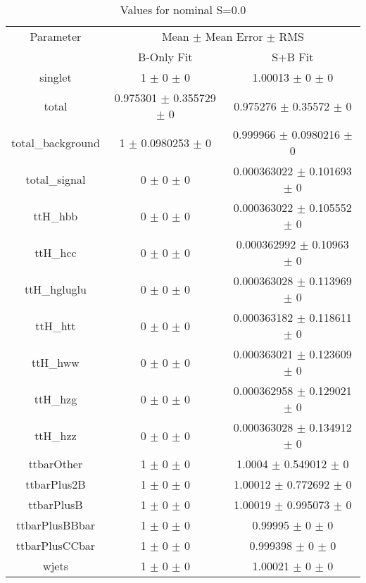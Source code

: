 \begin{table}
\centering
\caption{Values for nominal S=0.0}
\begin{tabular}{ccc}
\toprule
Parameter & \multicolumn{2}{c}{Mean $\pm$ Mean Error $\pm$ RMS}\\
 & B-Only Fit & S+B Fit\\
\midrule
singlet & \num{1} $\pm$ \num{0} $\pm$ \num{0} & \num{1.00013} $\pm$ \num{0} $\pm$ \num{0}\\
total & \num{0.975301} $\pm$ \num{0.355729} $\pm$ \num{0} & \num{0.975276} $\pm$ \num{0.35572} $\pm$ \num{0}\\
total\_background & \num{1} $\pm$ \num{0.0980253} $\pm$ \num{0} & \num{0.999966} $\pm$ \num{0.0980216} $\pm$ \num{0}\\
total\_signal & \num{0} $\pm$ \num{0} $\pm$ \num{0} & \num{0.000363022} $\pm$ \num{0.101693} $\pm$ \num{0}\\
ttH\_hbb & \num{0} $\pm$ \num{0} $\pm$ \num{0} & \num{0.000363022} $\pm$ \num{0.105552} $\pm$ \num{0}\\
ttH\_hcc & \num{0} $\pm$ \num{0} $\pm$ \num{0} & \num{0.000362992} $\pm$ \num{0.10963} $\pm$ \num{0}\\
ttH\_hgluglu & \num{0} $\pm$ \num{0} $\pm$ \num{0} & \num{0.000363028} $\pm$ \num{0.113969} $\pm$ \num{0}\\
ttH\_htt & \num{0} $\pm$ \num{0} $\pm$ \num{0} & \num{0.000363182} $\pm$ \num{0.118611} $\pm$ \num{0}\\
ttH\_hww & \num{0} $\pm$ \num{0} $\pm$ \num{0} & \num{0.000363021} $\pm$ \num{0.123609} $\pm$ \num{0}\\
ttH\_hzg & \num{0} $\pm$ \num{0} $\pm$ \num{0} & \num{0.000362958} $\pm$ \num{0.129021} $\pm$ \num{0}\\
ttH\_hzz & \num{0} $\pm$ \num{0} $\pm$ \num{0} & \num{0.000363028} $\pm$ \num{0.134912} $\pm$ \num{0}\\
ttbarOther & \num{1} $\pm$ \num{0} $\pm$ \num{0} & \num{1.0004} $\pm$ \num{0.549012} $\pm$ \num{0}\\
ttbarPlus2B & \num{1} $\pm$ \num{0} $\pm$ \num{0} & \num{1.00012} $\pm$ \num{0.772692} $\pm$ \num{0}\\
ttbarPlusB & \num{1} $\pm$ \num{0} $\pm$ \num{0} & \num{1.00019} $\pm$ \num{0.995073} $\pm$ \num{0}\\
ttbarPlusBBbar & \num{1} $\pm$ \num{0} $\pm$ \num{0} & \num{0.99995} $\pm$ \num{0} $\pm$ \num{0}\\
ttbarPlusCCbar & \num{1} $\pm$ \num{0} $\pm$ \num{0} & \num{0.999398} $\pm$ \num{0} $\pm$ \num{0}\\
wjets & \num{1} $\pm$ \num{0} $\pm$ \num{0} & \num{1.00021} $\pm$ \num{0} $\pm$ \num{0}\\
\bottomrule
\end{tabular}
\end{table}